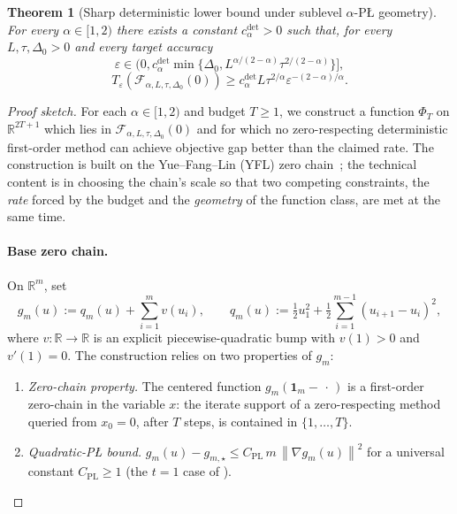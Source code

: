 \documentclass[11pt]{article}
\newtheorem{theorem}{Theorem}[section]
\newcommand{\R}{\mathbb{R}}
\newcommand{\norm}[1]{\left\lVert #1\right\rVert}
\newcommand{\one}{\mathbf{1}}
\begin{document}
\begin{theorem}[Sharp deterministic lower bound under sublevel $\alpha$-P\L{} geometry]
\label{thm:matching}
For every $\alpha\in[1,2)$ there exists a constant \(c_\alpha^{\mathrm{det}}>0\) such that, for every
$L,\tau,\Delta_0>0$ and every target accuracy
\[
\varepsilon\in\bigl(0,c_\alpha^{\mathrm{det}}\min\{\Delta_0,L^{\alpha/(2-\alpha)}\tau^{2/(2-\alpha)}\}\bigr],
\]
\[
T_\varepsilon\!\left(\mathcal F_{\alpha,L,\tau,\Delta_0}(0)\right)
\ge
c_\alpha^{\mathrm{det}} L\tau^{2/\alpha}\varepsilon^{-(2-\alpha)/\alpha}.
\]
\end{theorem}

\begin{proof}[Proof sketch]
For each \(\alpha\in[1,2)\) and budget \(T\ge 1\), we construct a function \(\Phi_T\) on \(\R^{2T+1}\) which lies in \(\mathcal F_{\alpha,L,\tau,\Delta_0}(0)\) and for which no zero-respecting
deterministic first-order method can achieve objective gap better than the claimed rate. The construction is built on
the Yue--Fang--Lin (YFL) zero chain~\citep{YueFangLin2023}; the technical content is in choosing the chain's scale so
that two competing constraints, the \emph{rate} forced by the budget and the \emph{geometry} of the function class, are met at the same time.

\paragraph{Base zero chain.}
On \(\R^m\), set
\[
g_m(u):=q_m(u)+\sum_{i=1}^m v(u_i),
\qquad
q_m(u):=\tfrac12 u_1^2+\tfrac12\sum_{i=1}^{m-1}(u_{i+1}-u_i)^2,
\]
where \(v:\R\to\R\) is an explicit piecewise-quadratic bump with \(v(1)>0\) and \(v'(1)=0\). The construction relies
on two properties of \(g_m\):
\begin{enumerate}[label=(P\arabic*),leftmargin=2.4em,itemsep=0.2em]
\item \emph{Zero-chain property.} The centered function \(g_m(\one_m-\,\cdot\,)\) is a first-order zero-chain in
the variable \(x\): the iterate support of a zero-respecting method queried from \(x_0=0\), after \(T\) steps, is contained
in \(\{1,\ldots,T\}\).
\item \emph{Quadratic-P\L{} bound.} \(g_m(u)-g_{m,\star}\le C_{\mathrm{PL}}\,m\,\norm{\nabla g_m(u)}^2\) for a universal
constant \(C_{\mathrm{PL}}\ge 1\) (the \(t=1\) case of \citep[Lemma~2]{YueFangLin2023}).
\end{enumerate}


\end{proof}
\end{document}
